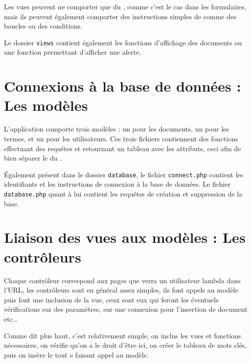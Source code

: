 \documentclass[12pt,a4paper,openany]{book}
\begin{document}
		Les vues peuvent ne comporter que du , comme c'est le cas dans les formulaires, mais ils peuvent également comporter des instructions simples
		de  comme des boucles ou des conditions.

		Le dossier \texttt{views} contient également les fonctions d'affichage des documents ou une fonction permettant d'afficher une alerte. 
			
		\section{Connexions à la base de données : Les modèles}
		L'application comporte trois modèles : un pour les documents, un pour les termes, et un pour les utilisateurs. Ces trois fichiers contiennent des fonctions effectuant des
		requêtes et retournant un tableau avec les attributs, ceci afin de bien séparer le  du .

		Également présent dans le dossier \texttt{database}, le fichier \texttt{connect.php} contient les identifiants et les
		instructions de connexion à la base de données. Le fichier \texttt{database.php} quant à lui contient les requêtes de
		création et suppression de la base.

		
		
		\section{Liaison des vues aux modèles : Les contrôleurs}
		Chaque contrôleur correspond aux pages que verra un utilisateur lambda dans l'URL, les contrôleurs sont en général assez
		simples, ils font appels au modèle puis font une inclusion de la vue, ceux sont eux qui feront les éventuels vérifications
		sur des paramètres, sur une connexion pour l'insertion de document etc\ldots
		
		Comme dit plus haut, c'est relativement simple, on inclus les vues et fonctions nécessaires, on vérifie qu'on a le droit
		d'être ici, on créer le tableau de mots clés, puis on insère le tout e faisant appel au modèle.
\end{document}
